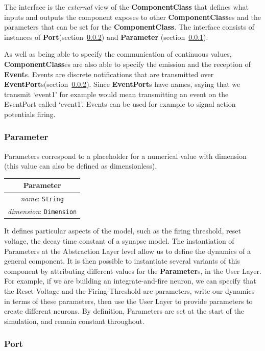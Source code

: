 \documentclass{article}
\newcommand{\ComponentClass}{{\bf{ComponentClass}}\xspace}
\newcommand{\ComponentClasses}{{\bf{ComponentClass}}es\xspace}
\newcommand{\EventPorts}{{\bf{EventPort}}s\xspace}
\newcommand{\Port}{{\bf{Port}}\xspace}
\newcommand{\Events}{{\bf{Event}}s\xspace}
\newcommand{\Parameter}{{\bf{Parameter}}\xspace}
\newcommand{\Parameters}{{\bf{Parameter}}s\xspace}
\begin{document}
The interface is the \emph{external} view of the \ComponentClass that defines
what inputs and outputs the component exposes to other \ComponentClasses and the
parameters that can be set for the \ComponentClass. The interface consists of
instances of \Port (section~\ref{port}) and \Parameter
(section~\ref{parameters}).

As well as being able to specify the communication of continuous values,
\ComponentClasses are also able to specify the emission and the reception
of \Events. Events are discrete notifications
that are transmitted over \EventPorts (section~\ref{port}). Since
\EventPorts have names, saying that we transmit `event1' for example
would mean transmitting an event on the EventPort called `event1'. Events
can be used for example to signal action potentials firing.

\subsubsection{Parameter}
\label{parameters}

Parameters correspond to a placeholder for a numerical value with
dimension (this value can also be defined as dimensionless).

\begin{table}[htb]
\center
\begin{tabular}{|c|}
\hline
\hline
Parameter \\
\hline
\hline
{\em name}: {\tt String} \\
\hline
{\em dimension}: {\tt Dimension} \\
\hline
\end{tabular}
\end{table}

It defines particular aspects of the model, such as the firing threshold,
reset voltage, the
decay time constant of a synapse model.  The instantiation of
Parameters at the Abstraction Layer level allow us to define the
dynamics of a general component.  It is then possible to instantiate
several variants of this component by attributing different values for
the \Parameters, in the User Layer.  For example, if we are building
an integrate-and-fire neuron, we can specify that the Reset-Voltage
and the Firing-Threshold are parameters, write our dynamics in terms
of these parameters, then use the User Layer to provide parameters to
create different neurons. By definition, Parameters are set at the
start of the simulation, and remain constant throughout.


\subsubsection{Port}
\label{port}
\end{document}
